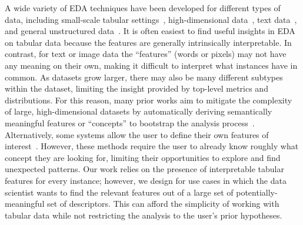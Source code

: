A wide variety of EDA techniques have been developed for different types of data, including small-scale tabular settings~\cite{wongsuphasawat_voyager_2016,lee_2021_lux}, high-dimensional data~\cite{Liu2017}, text data~\cite{felix_texttile_2017}, and general unstructured data~\cite{Smilkov2016}.
It is often easiest to find useful insights in EDA on tabular data because the features are generally intrinsically interpretable. 
In contrast, for text or image data the ``features'' (words or pixels) may not have any meaning on their own, making it difficult to interpret what instances have in common.
As datasets grow larger, there may also be many different subtypes within the dataset, limiting the insight provided by top-level metrics and distributions.
For this reason, many prior works aim to mitigate the complexity of large, high-dimensional datasets by automatically deriving semantically meaningful features or ``concepts'' to bootstrap the analysis process~\cite{suresh_kaleidoscope_2023,kim_interpretability_2018}.
Alternatively, some systems allow the user to define their own features of interest~\cite{wu_errudite_2020,cabrera_zeno_2023}.
However, these methods require the user to already know roughly what concept they are looking for, limiting their opportunities to explore and find unexpected patterns.
Our work relies on the presence of interpretable tabular features for every instance; however, we design for use cases in which the data scientist wants to find the relevant features out of a large set of potentially-meaningful set of descriptors.
This can afford the simplicity of working with tabular data while not restricting the analysis to the user's prior hypotheses.


